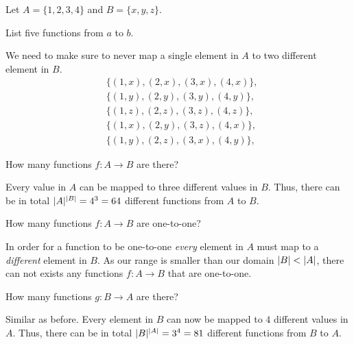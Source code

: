 \documentclass[a4paper, english, 12pt]{article} %
\begin{document}
\begin{problem}[3]
  Let $A = \{1, 2, 3, 4\}$ and $B = \{x, y, z\}$.
\end{problem}


\begin{subproblem}
  List five functions from $a$ to $b$.
\end{subproblem}

\begin{answer}
  \noindent
  We need to make sure to never map a single element in $A$ to two
  different element in $B$.
  \begin{align*}
  & \{ (1,x), (2,x), (3,x), (4,x) \}, \\
  & \{ (1,y), (2,y), (3,y), (4,y) \},  \\
  & \{ (1,z), (2,z), (3,z), (4,z) \}, \\
  & \{ (1,x), (2,y), (3,z), (4,x) \}, \\
  & \{ (1,y), (2,z), (3,x), (4,y) \}, 
  \end{align*}
\end{answer}

\begin{subproblem}
  How many functions $f \colon A \to B$ are there?
\end{subproblem}

\begin{answer}
  Every value in $A$ can be mapped to three different values in $B$. Thus, there
  can be in total $\lvert A\rvert^{\lvert B\rvert} = 4^3 = 64$ different functions from $A$ to
  $B$.
\end{answer}

\begin{subproblem}
  How many functions $f \colon A \to B$ are one-to-one?
\end{subproblem}

\begin{answer}
  In order for a function to be one-to-one \emph{every} element in $A$ must map to a
  \emph{different} element in $B$. As our range is smaller than our domain
  $\lvert B\rvert<\lvert A\rvert$, there can not exists any functions $f \colon A \to B$ that are one-to-one.
\end{answer}

\begin{subproblem}
  How many functions $g \colon B \to A$ are there?
\end{subproblem}

\begin{answer}
  Similar as before. Every element in $B$ can now be mapped to $4$ different
  values in $A$. Thus, there can be in total $\lvert B\rvert^{\lvert A\rvert}= 3^4 = 81$
  different functions from $B$ to $A$. 
\end{answer}
\end{document}
